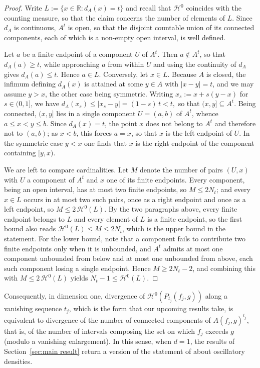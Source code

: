 \documentclass[12pt]{article}
\newcommand{\RR}{\mathbb{R}}
\begin{document}
\begin{proof}
Write $L := \{x \in \RR : d_A(x) = t\}$ and recall that $\mathcal H^{0}$ coincides with the counting measure, so that the claim concerns the number of elements of $L$. Since $d_A$ is continuous, $A^{t}$ is open, so that the disjoint countable union of its connected components, each of which is a non-empty open interval, is well defined.%

Let $a$ be a finite endpoint of a component $U$ of $A^t$. Then $a\notin A^t$, so that $d_A(a)\geq t$, while approaching $a$ from within $U$ and using the continuity of $d_A$ gives $d_A(a)\leq t$. Hence $a\in L$. Conversely, let $x\in L$. Because $A$ is closed, the infimum defining $d_A(x)$ is attained at some $y\in A$ with $|x-y|=t$, and we may assume $y>x$, the other case being symmetric. Writing $x_s := x+s(y-x)$ for $s\in(0,1]$, we have
$
d_A(x_s) \leq |x_s - y| = (1-s)\,t < t ,
$
so that $(x,y]\subseteq A^{t}$. Being connected, $(x,y]$ lies in a single component $U=(a,b)$ of $A^t$, whence $a\leq x<y\leq b$. Since $d_A(x)=t$, the point $x$ does not belong to $A^t$ and therefore not to $(a,b)$; as $x<b$, this forces $a=x$, so that $x$ is the left endpoint of $U$. In the symmetric case $y<x$ one finds that $x$ is the right endpoint of the component containing $[y,x)$.

We are left to compare cardinalities. Let $M$ denote the number of pairs $(U,x)$ with $U$ a component of $A^t$ and $x$ one of its finite endpoints. Every component, being an open interval, has at most two finite endpoints, so $M\leq 2N_t$; and every $x\in L$ occurs in at most two such pairs, once as a right endpoint and once as a left endpoint, so $M\leq 2\,\mathcal H^0(L)$. By the two paragraphs above, every finite endpoint belongs to $L$ and every element of $L$ is a finite endpoint, so the first bound also reads $\mathcal H^0(L)\leq M\leq 2N_t$, which is the upper bound in the statement. For the lower bound, note that a component fails to contribute two finite endpoints only when it is unbounded, and $A^t$ admits at most one component unbounded from below and at most one unbounded from above, each such component losing a single endpoint. Hence $M\geq 2N_t-2$, and combining this with $M\leq 2\,\mathcal H^0(L)$ yields $N_t-1\leq \mathcal H^0(L)$.
\end{proof}

Consequently, in dimension one, divergence of $\mathcal H^{0}(P_{t_j}(f_j,g))$ along a vanishing sequence $t_j$, which is the form that our upcoming results take, is equivalent to divergence of the number of connected components of $A(f_j,g)^{t_j}$, that is, of the number of intervals composing the set on which $f_j$ exceeds $g$ (modulo a vanishing enlargement). In this sense, when $d=1$, the results of Section~\ref{sec:main result} return a version of the statement of \cite{bariletto2025identifiability} about oscillatory densities.
\end{document}

